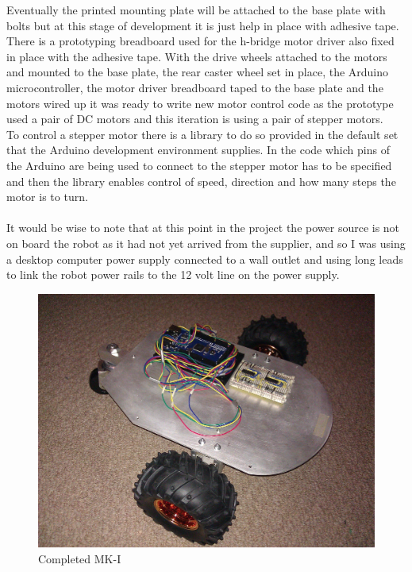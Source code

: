 Eventually the printed mounting plate will be attached to the base plate with bolts but at this stage of development it is just help in place with adhesive tape.  There is a prototyping breadboard used for the h-bridge motor driver also fixed in place with the adhesive tape. With the drive wheels attached to the motors and mounted to the base plate, the rear caster wheel set in place, the Arduino microcontroller, the motor driver breadboard taped to the base plate and the motors wired up it was ready to write new motor control code as the prototype used a pair of DC motors and this iteration is using a pair of stepper motors.
\\To control a stepper motor there is a library to do so provided in the default set that the Arduino development environment supplies.  In the code which pins of the Arduino are being used to connect to the stepper motor has to be specified and then the library enables control of speed, direction and how many steps the motor is to turn.
\\\\It would be wise to note that at this point in the project the power source is not on board the robot as it had not yet arrived from the supplier, and so I was using a desktop computer power supply connected to a wall outlet and using long leads to link the robot power rails to the 12 volt line on the power supply.
\begin{figure}[H]
\centering
        \includegraphics[width=5.0in]  {Images/tria-mkII.jpg}
        \caption{Completed MK-I}
        \label{Completed MK-I}
\end{figure}
